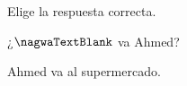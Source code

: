 
\begin{question}

\begin{instance}
    
\begin{mcq}[standalone=false]
      
\begin{stem}
        Elige la respuesta correcta.\par
        
\begin{enumerationnolabel}
          \item{¿$\nagwaTextBlank$ va Ahmed?}          \item{Ahmed va al supermercado.}        
\end{enumerationnolabel}
      
\end{stem}
      
\begin{distractors}
\end{distractors}
                      
\end{mcq}
  
\end{instance}

\end{question}
